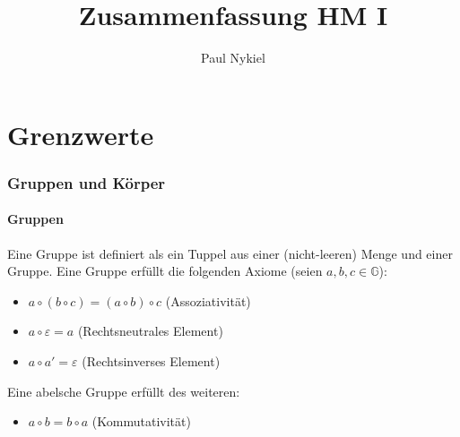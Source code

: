 \documentclass[12pt]{article}
\title{Zusammenfassung HM I}
\author{Paul Nykiel}
\begin{document}
    \maketitle
    \pagebreak
    \tableofcontents
    \pagebreak

    \part{Grenzwerte}
    \section{Gruppen und Körper}
    \subsection{Gruppen}
    Eine Gruppe ist definiert als ein Tuppel aus einer (nicht-leeren) Menge
    und einer Gruppe.
    Eine Gruppe erfüllt die folgenden Axiome (seien $a,b,c \in \mathbb{G}$):
    \begin{itemize}
        \item $a \circ (b \circ c) = (a \circ b) \circ c$ (Assoziativität)
        \item $a \circ \varepsilon = a$ (Rechtsneutrales Element)
        \item $a \circ a' = \varepsilon$ (Rechtsinverses Element)
    \end{itemize}
    Eine abelsche Gruppe erfüllt des weiteren:
    \begin{itemize}
        \item $a \circ b = b \circ a$ (Kommutativität)
    \end{itemize}
\end{document}
